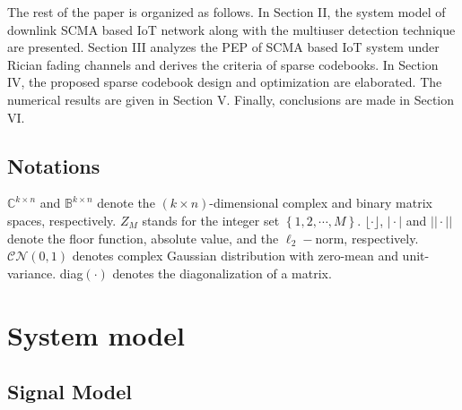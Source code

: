 \documentclass[journal]{IEEEtran}
\begin{document}
The rest of the paper is organized as follows. In Section II, the system model of downlink SCMA based IoT network along with  the  multiuser detection technique are presented.   Section III analyzes the PEP of SCMA based IoT system  under Rician fading channels and derives  the criteria of  sparse codebooks. In Section IV, the proposed sparse codebook  design and optimization are elaborated.  The numerical results are given in Section V. Finally, conclusions are made in Section VI.

 \subsection{Notations}

  $\mathbb{C}^{k\times n}$ and $\mathbb{B}^{k\times n}$ denote the $(k\times n)$-dimensional complex and binary matrix spaces, respectively.  ${{Z}_{{{M} }}}$ stands for the integer set $\left\{ 1,2,\cdots ,{{M} } \right\}$. %
$\lfloor \cdot \rfloor$, ${\mathrm{|}}\cdot {\mathrm{|}}$ and ${\mathrm{||}}\cdot {\mathrm{||}}$ denote the floor function, absolute value, and the $\mathcal   \ell _{2}-\mathrm {norm}$, respectively.  
$ \mathcal{CN}\left (0, 1\right )$  denotes complex Gaussian distribution with  zero-mean and unit-variance. diag$ (\cdot ) $ denotes the diagonalization of a matrix.



\section{System model}
 \label{sec2}
\subsection{Signal Model}
 
\end{document}
